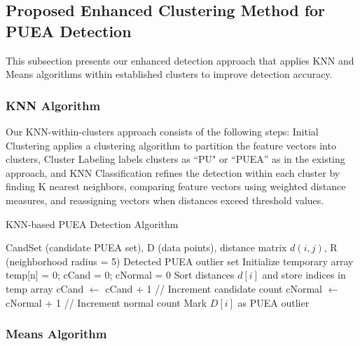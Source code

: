 \documentclass[pdflatex,sn-mathphys-num]{sn-jnl}%
\theoremstyle{thmstyleone}
\theoremstyle{thmstyletwo}
\theoremstyle{thmstylethree}
\begin{document}
\subsection{Proposed Enhanced Clustering Method for PUEA Detection}\label{subsec:enhanced_clustering}

This subsection presents our enhanced detection approach that applies KNN and Means algorithms within established clusters to improve detection accuracy.

\subsubsection{KNN Algorithm}

Our KNN-within-clusters approach consists of the following steps: Initial Clustering applies a clustering algorithm to partition the feature vectors into clusters, Cluster Labeling labels clusters as ``PU" or ``PUEA'' as in the existing approach, and KNN Classification refines the detection within each cluster by finding K nearest neighbors, comparing feature vectors using weighted distance measures, and reassigning vectors when distances exceed threshold values.

\begin{algorithm}[H]
\caption{KNN-based PUEA Detection Algorithm}
\label{alg:knn}
\begin{algorithmic}[1]
\Require CandSet (candidate PUEA set), D (data points), distance matrix $d(i,j)$, R (neighborhood radius = 5)
\Ensure Detected PUEA outlier set
\State
{}
    \State Initialize temporary array temp[n] = 0; cCand = 0; cNormal = 0
    \State Sort distances $d[i]$ and store indices in temp array
            \State cCand $\leftarrow$ cCand + 1 \hfill // Increment candidate count
        \Else 
            \State cNormal $\leftarrow$ cNormal + 1 \hfill // Increment normal count
        \EndIf
    \EndFor
        \State Mark $D[i]$ as PUEA outlier
    \EndIf
\EndFor
\end{algorithmic}
\end{algorithm}

\subsubsection{Means Algorithm}
\end{document}
